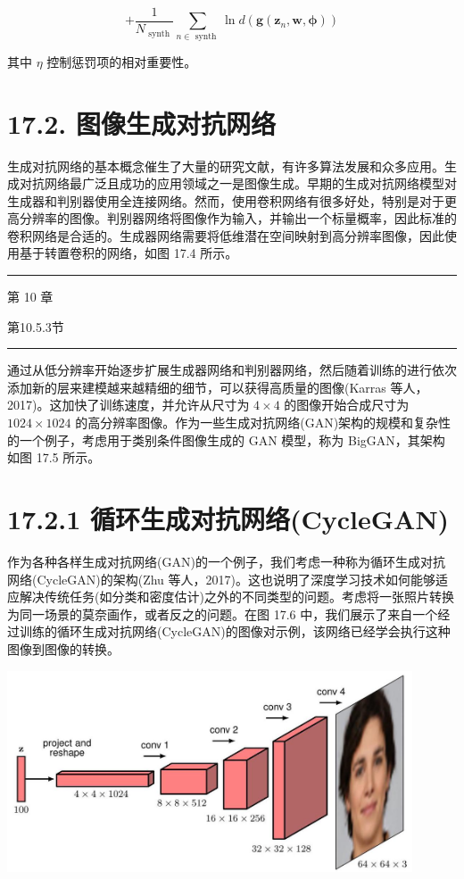 \documentclass[10pt]{article}
\newcommand{\HRule}{\begin{center}\rule{0.9\linewidth}{0.2mm}\end{center}}
\begin{document}
\[
+ \frac{1}{{N}_{\text{ synth }}}\mathop{\sum }\limits_{{n \in  \text{ synth }}}\ln d\left( {\mathbf{g}\left( {{\mathbf{z}}_{n},\mathbf{w},\mathbf{\phi }}\right) }\right)  \tag{17.11}
\]

其中 \(\eta\) 控制惩罚项的相对重要性。

\section*{17.2. 图像生成对抗网络}

生成对抗网络的基本概念催生了大量的研究文献，有许多算法发展和众多应用。生成对抗网络最广泛且成功的应用领域之一是图像生成。早期的生成对抗网络模型对生成器和判别器使用全连接网络。然而，使用卷积网络有很多好处，特别是对于更高分辨率的图像。判别器网络将图像作为输入，并输出一个标量概率，因此标准的卷积网络是合适的。生成器网络需要将低维潜在空间映射到高分辨率图像，因此使用基于转置卷积的网络，如图 17.4 所示。

\HRule

第 10 章

第10.5.3节

\HRule

通过从低分辨率开始逐步扩展生成器网络和判别器网络，然后随着训练的进行依次添加新的层来建模越来越精细的细节，可以获得高质量的图像(Karras 等人，2017)。这加快了训练速度，并允许从尺寸为 \(4 \times  4\) 的图像开始合成尺寸为 \({1024} \times  {1024}\) 的高分辨率图像。作为一些生成对抗网络(GAN)架构的规模和复杂性的一个例子，考虑用于类别条件图像生成的 GAN 模型，称为 BigGAN，其架构如图 17.5 所示。

\section*{17.2.1 循环生成对抗网络(CycleGAN)}

作为各种各样生成对抗网络(GAN)的一个例子，我们考虑一种称为循环生成对抗网络(CycleGAN)的架构(Zhu 等人，2017)。这也说明了深度学习技术如何能够适应解决传统任务(如分类和密度估计)之外的不同类型的问题。考虑将一张照片转换为同一场景的莫奈画作，或者反之的问题。在图 17.6 中，我们展示了来自一个经过训练的循环生成对抗网络(CycleGAN)的图像对示例，该网络已经学会执行这种图像到图像的转换。

\begin{center}
\includegraphics[max width=0.9\textwidth]{images/0194e279-9b28-703a-88f4-c3ac21e2010d_558_329_1340_1136_565_0.jpg}
\end{center}
\hspace*{3em} 
\end{document}
